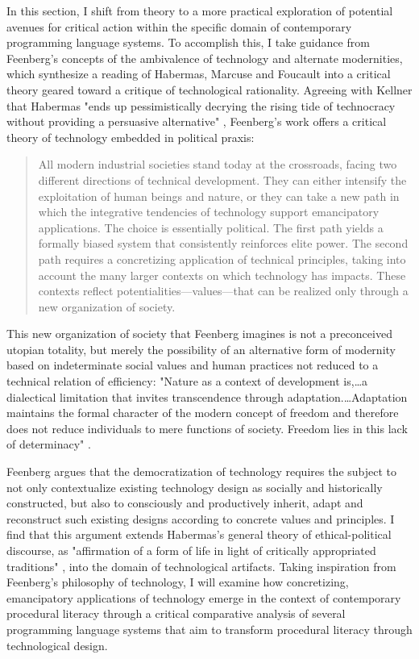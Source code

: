 In this section, I shift from theory to a more practical exploration of potential avenues for critical action within the specific domain of contemporary programming language systems. To accomplish this, I take guidance from Feenberg's concepts of the ambivalence of technology and alternate modernities, which synthesize a reading of Habermas, Marcuse and Foucault into a critical theory geared toward a critique of technological rationality. Agreeing with Kellner that Habermas "ends up pessimistically decrying the rising tide of technocracy without providing a persuasive alternative" \autocite*[85]{Feenberg1993}, Feenberg's work offers a critical theory of technology embedded in political praxis:
\blockquote{
  All modern industrial societies stand today at the crossroads, facing two different directions of technical development. They can either intensify the exploitation of human beings and nature, or they can take a new path in which the integrative tendencies of technology support emancipatory applications. The choice is essentially political. The first path yields a formally biased system that consistently reinforces elite power. The second path requires a concretizing application of technical principles, taking into account the many larger contexts on which technology has impacts. These contexts reflect potentialities---values---that can be realized only through a new organization of society. \autocite*[188]{Feenberg2002}
}
This new organization of society that Feenberg imagines is not a preconceived utopian totality, but merely the possibility of an alternative form of modernity based on indeterminate social values and human practices not reduced to a technical relation of efficiency: "Nature as a context of development is,…a dialectical limitation that invites transcendence through adaptation.…Adaptation maintains the formal character of the modern concept of freedom and therefore does not reduce individuals to mere functions of society. Freedom lies in this lack of determinacy" \autocite[190]{Feenberg2002}.

Feenberg argues that the democratization of technology requires the subject to not only contextualize existing technology design as socially and historically constructed, but also to consciously and productively inherit, adapt and reconstruct such existing designs according to concrete values and principles. I find that this argument extends Habermas's general theory of ethical-political discourse, as "affirmation of a form of life in light of critically appropriated traditions" \autocite*[163]{Habermas-bfn}, into the domain of technological artifacts. Taking inspiration from Feenberg's philosophy of technology, I will examine how concretizing, emancipatory applications of technology emerge in the context of contemporary procedural literacy through a critical comparative analysis of several programming language systems that aim to transform procedural literacy through technological design.


